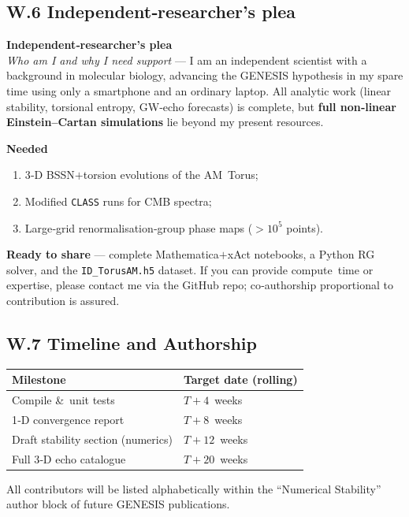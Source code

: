 \documentclass{article}
\begin{document}
\subsection{W.6  Independent‑researcher’s plea}

\begin{tcolorbox}[enhanced,width=\linewidth,
  colframe=black,colback=gray!8,
  colbacktitle=black,coltitle=white,
  title=Call for Collaboration,fonttitle=\bfseries,
  left=2mm,right=2mm,top=0.8mm,bottom=0.8mm,boxrule=0.4pt]

\textbf{Independent‑researcher’s plea}\\
\emph{Who am I and why I need support} —  
I am an independent scientist with a background in molecular biology, 
advancing the GENESIS hypothesis in my spare time using only a smartphone 
and an ordinary laptop.  All analytic work (linear stability, torsional 
entropy, GW‑echo forecasts) is complete, but \textbf{full non‑linear 
Einstein–Cartan simulations} lie beyond my present resources.

\medskip\noindent
\textbf{Needed}\\[-0.7em]
\begin{enumerate}
  \item 3‑D BSSN$+$torsion evolutions of the AM Torus;
  \item Modified \texttt{CLASS} runs for CMB spectra;
  \item Large‑grid renormalisation‑group phase maps ($>10^{5}$ points).
\end{enumerate}

\medskip\noindent
\textbf{Ready to share} — complete Mathematica$+$xAct notebooks, a Python RG
solver, and the \texttt{ID\_TorusAM.h5} dataset.  
If you can provide compute time or expertise, please contact me via the 
GitHub repo; co‑authorship proportional to contribution is assured.
\end{tcolorbox}

\subsection{W.7  Timeline and Authorship}
\begin{center}
\begin{tabular}{@{}l|l@{}}
\textbf{Milestone} & \textbf{Target date (rolling)}\\\hline
Compile \& unit tests & $T+4$ weeks\\
1‑D convergence report & $T+8$ weeks\\
Draft stability section (numerics) & $T+12$ weeks\\
Full 3‑D echo catalogue & $T+20$ weeks\\
\end{tabular}
\end{center}
All contributors will be listed alphabetically within the “Numerical 
Stability” author block of future GENESIS publications.
\end{document}
